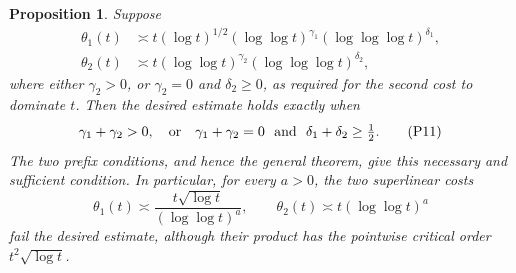 \documentclass[11pt]{article}
\newtheorem{proposition}[theorem]{Proposition}
\numberwithin{equation}{section}
\begin{document}
\begin{proposition}\label{pair:prop:iterated}
Suppose
\begin{align*}
 \theta_1(t)&\asymp
 t(\log t)^{1/2}(\log\log t)^{\gamma_1}
                    (\log\log\log t)^{\delta_1},\\
 \theta_2(t)&\asymp
 t(\log\log t)^{\gamma_2}(\log\log\log t)^{\delta_2},
\end{align*}
where either \(\gamma_2>0\), or \(\gamma_2=0\) and
\(\delta_2\ge0\), as required for the second cost to dominate
\(t\).  Then the desired estimate holds exactly when
\[
 \gamma_1+\gamma_2>0,
 \quad\hbox{or}\quad
 \gamma_1+\gamma_2=0\ \hbox{ and }\ \delta_1+\delta_2\ge\tfrac12.
 \tag{P11}\label{pair:eq:iterated-condition}
\]
The two prefix conditions, and hence the general theorem, give this
necessary and sufficient condition.
In particular, for every \(a>0\), the two superlinear costs
\[
 \theta_1(t)\asymp\frac{t\sqrt{\log t}}{(\log\log t)^a},
 \qquad \theta_2(t)\asymp t(\log\log t)^a
\]
fail the desired estimate, although their product has the pointwise
critical order \(t^2\sqrt{\log t}\).
\end{proposition}
\end{document}

